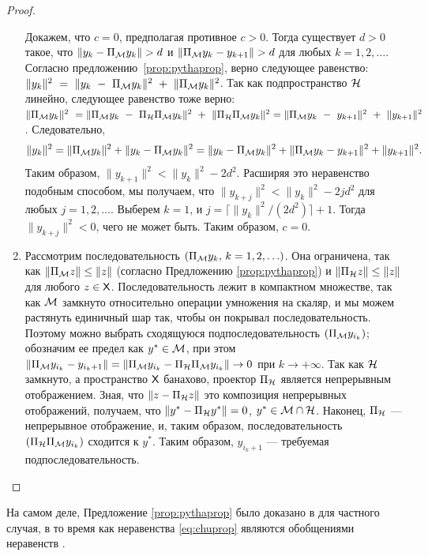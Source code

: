 \documentclass[12pt, specialist, subf,href,colorlinks=true,substylefile = spbu.rtx]{disser}
\theoremstyle{remark}
\theoremstyle{definition}
\begin{document}
\begin{proof}
\begin{enumerate}
		Докажем, что $c = 0$, предполагая противное $c > 0$. Тогда существует $d > 0$ такое, что $\|y_k - \Pi_{\mathcal{M}} y_k\| > d$ и $\|\Pi_{\mathcal{M}} y_k - y_{k + 1}\| > d$ для любых $k = 1, 2, \ldots$. Согласно предложению~\ref{prop:pythaprop}, верно следующее равенство: $\|y_k \|^2~=~\|y_k~-~\Pi_{\mathcal{M}} y_k\|^2~+~\|\Pi_{\mathcal{M}} y_k \|^2$. Так как подпространство $\mathcal{H}$ линейно, следующее равенство тоже верно:
		$\|\Pi_{\mathcal{M}} y_k \|^2~=\|\Pi_{\mathcal{M}} y_k~-~\Pi_{\mathcal{H}} \Pi_{\mathcal{M}} y_k\|^2~+~\|\Pi_{\mathcal{H}} \Pi_{\mathcal{M}} y_k \|^2 = \|\Pi_{\mathcal{M}} y_k~-~y_{k+1}\|^2~+~\|y_{k+1} \|^2$. Следовательно,
		\begin{equation*}
		\|y_k\|^2 = \|\Pi_{\mathcal{M}} y_k\|^2 + \|y_k - \Pi_{\mathcal{M}} y_k\|^2 = \|y_k - \Pi_{\mathcal{M}} y_k\|^2 + \|\Pi_{\mathcal{M}} y_k - y_{k + 1}\|^2 + \|y_{k + 1}\|^2.
		\end{equation*}
		Таким образом, $\|y_{k+1}\|^2 < \|y_k\|^2 - 2d^2$. Расширяя это неравенство подобным способом, мы получаем, что $\|y_{k+j}\|^2 < \|y_k\|^2 - 2 j d^2$ для любых $j = 1, 2, \ldots$. Выберем $k = 1$, и $j = \lceil \|y_k\|^2 / (2d^2) \rceil + 1$. Тогда $\|y_{k+j}\|^2 < 0$, чего не может быть. Таким образом, $c=0$.
		\item Рассмотрим последовательность $(\Pi_{\mathcal{M}} y_k,\, k = 1, 2, \ldots)$. Она ограничена, так как $\|\Pi_{\mathcal{M}} z\| \le \|z\|$ (согласно Предложению \ref{prop:pythaprop}) и $\|\Pi_{\mathcal{H}} z\| \le \|z\|$ для любого $z \in \mathsf{X}$. Последовательность лежит в компактном множестве, так как $\mathcal{M}$ замкнуто относительно операции умножения на скаляр, и мы можем растянуть единичный шар так, чтобы он покрывал последовательность. Поэтому можно выбрать сходящуюся подпоследовательность $(\Pi_{\mathcal{M}} y_{i_k})$; обозначим ее предел как $y^*\in\mathcal{M}$, при этом $\|\Pi_{\mathcal{M}} y_{i_k} - y_{i_k + 1}\| = \|\Pi_{\mathcal{M}} y_{i_k} - \Pi_{\mathcal{H}} \Pi_{\mathcal{M}} y_{i_k}\| \to 0$ при $k \to + \infty$. Так как $\mathcal{H}$ замкнуто, а пространство $\mathsf{X}$ банахово, проектор $\Pi_{\mathcal{H}}$ является непрерывным отображением. Зная, что $\|z - \Pi_{\mathcal{H}} z\|$ это композиция непрерывных отображений, получаем, что $\|y^* - \Pi_{\mathcal{H}} y^*\| = 0$, $y^* \in \mathcal{M} \cap \mathcal{H}$. Наконец, $\Pi_{\mathcal{H}}$ --- непрерывное отображение, и, таким образом, последовательность $(\Pi_{\mathcal{H}} \Pi_{\mathcal{M}} y_{i_k})$ сходится к $y^*$. Таким образом, $y_{i_k + 1}$ --- требуемая подпоследовательность.
	\end{enumerate}
\end{proof}

На самом деле, Предложение \ref{prop:pythaprop} было доказано в \cite{Gillard.Zhigljavsky2013} для частного случая, в то время как неравенства \eqref{eq:chuprop} являются обобщениями неравенств \cite[(4.1)]{Chu.etal2003}.
\end{document}
